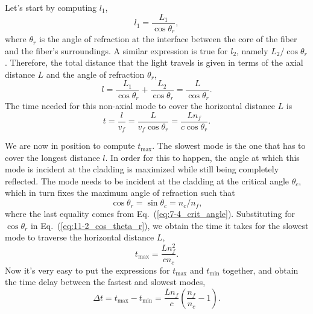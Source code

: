 Let's start by computing $l_1$,
\begin{equation}
    l_1=\frac{L_1}{\cos \theta_r},
\end{equation}
where $\theta_r$ is the angle of refraction at the interface between the core of the fiber and the fiber's surroundings.
A similar expression is true for $l_2$, namely $L_2 / \cos \theta_r$.
Therefore, the total distance that the light travels is given in terms of the axial distance $L$ and the angle of refraction $\theta_r$,
\begin{equation}
    l=\frac{L_1}{\cos \theta_r}+\frac{L_2}{\cos \theta_r}=\frac{L}{\cos \theta_r}.
\end{equation}
The time needed for this non-axial mode to cover the horizontal distance $L$ is
\begin{equation}
    t = \frac{l}{v_f} = \frac{L}{v_f \cos \theta_r} = \frac{L n_f}{c \cos \theta_r}.
    \label{eq:11-2_time_nonaxial}
\end{equation}

We are now in position to compute $t_{\max}$.
The slowest mode is the one that has to cover the longest distance $l$.
In order for this to happen, the angle at which this mode is incident at the cladding is maximized while still being completely reflected.
The mode needs to be incident at the cladding at the critical angle $\theta_c$, which in turn fixes the maximum angle of refraction such that
\begin{equation}
    \cos\theta_r = \sin\theta_c = n_c / n_f,
    \label{eq:11-2_cos_theta_r}
\end{equation}
where the last equality comes from Eq.~(\ref{eq:7-4_crit_angle}).
Substituting for $\cos\theta_r$ in Eq.~(\ref{eq:11-2_cos_theta_r}), we obtain the time it takes for the slowest mode to traverse the horizontal distance $L$,
\begin{equation}
    t_{\max }=\frac{L n_f^2}{c n_c}.
\end{equation}
Now it's very easy to put the expressions for $t_{\mathrm{max}}$ and $t_{\mathrm{min}}$ together, and obtain the time delay between the fastest and slowest modes, 
\begin{equation}
    \Delta t = t_{\max} - t_{\min} = \frac{L n_f}{c}\left(\frac{n_f}{n_c}-1\right).
    \label{eq:11-2_time_delay}
\end{equation}

